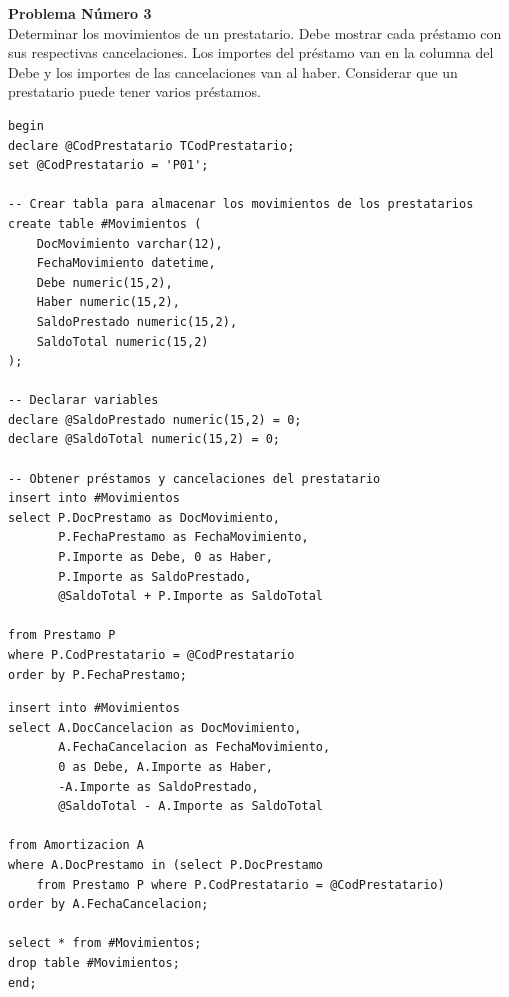 \documentclass[a4paper]{article}
\begin{document}
\newpage
\Large{\textbf{Problema Número 3}}\\
Determinar los movimientos de un prestatario. Debe mostrar cada préstamo con sus respectivas cancelaciones. Los importes del préstamo van en la columna del Debe y los importes de las cancelaciones van al haber. Considerar que un prestatario puede tener varios préstamos.
\begin{center}
\begin{mycodeboxl}
\begin{lstlisting}
begin
declare @CodPrestatario TCodPrestatario;
set @CodPrestatario = 'P01';

-- Crear tabla para almacenar los movimientos de los prestatarios
create table #Movimientos (
    DocMovimiento varchar(12),
    FechaMovimiento datetime,
    Debe numeric(15,2),
    Haber numeric(15,2),
    SaldoPrestado numeric(15,2),
    SaldoTotal numeric(15,2)
);

-- Declarar variables
declare @SaldoPrestado numeric(15,2) = 0;
declare @SaldoTotal numeric(15,2) = 0;

-- Obtener préstamos y cancelaciones del prestatario
insert into #Movimientos
select P.DocPrestamo as DocMovimiento,
       P.FechaPrestamo as FechaMovimiento,
       P.Importe as Debe, 0 as Haber,
       P.Importe as SaldoPrestado,
       @SaldoTotal + P.Importe as SaldoTotal

from Prestamo P
where P.CodPrestatario = @CodPrestatario
order by P.FechaPrestamo;
\end{lstlisting}
\end{mycodeboxl}
\end{center}
\newpage
\begin{center}
\begin{mycodeboxl}
\begin{lstlisting}
insert into #Movimientos
select A.DocCancelacion as DocMovimiento,
       A.FechaCancelacion as FechaMovimiento,
       0 as Debe, A.Importe as Haber,
       -A.Importe as SaldoPrestado,
       @SaldoTotal - A.Importe as SaldoTotal

from Amortizacion A
where A.DocPrestamo in (select P.DocPrestamo
    from Prestamo P where P.CodPrestatario = @CodPrestatario)
order by A.FechaCancelacion;

select * from #Movimientos;
drop table #Movimientos;
end;
\end{lstlisting}
\end{mycodeboxl}
\end{center}
\end{document}
